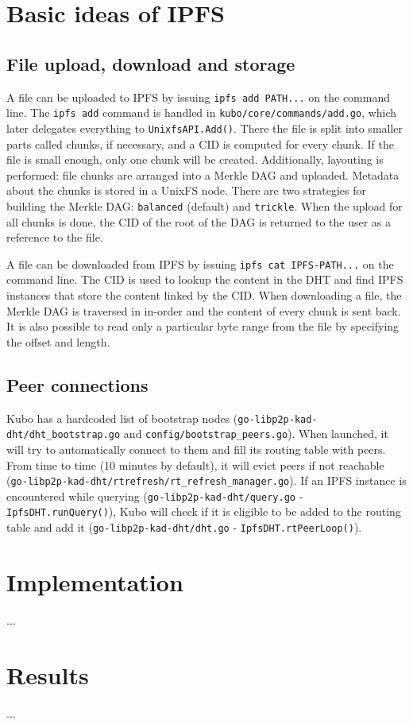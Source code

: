 




\section{Basic ideas of IPFS}

\subsection{File upload, download and storage}

A file can be uploaded to IPFS by issuing \verb|ipfs add PATH...| on the
command line. The \verb|ipfs add| command is handled in
\verb|kubo/core/commands/add.go|, which later delegates everything to
\verb|UnixfsAPI.Add()|. There the file is split into smaller parts called
chunks, if necessary, and a CID is computed for every chunk. If the file is
small enough, only one chunk will be created. Additionally, layouting is
performed: file chunks are arranged into a Merkle DAG and uploaded. Metadata
about the chunks is stored in a UnixFS node. There are two strategies for
building the Merkle DAG: \verb|balanced| (default) and \verb|trickle|. When the
upload for all chunks is done, the CID of the root of the DAG is returned to
the user as a reference to the file.

A file can be downloaded from IPFS by issuing \verb|ipfs cat IPFS-PATH...| on
the command line. The CID is used to lookup the content in the DHT and find
IPFS instances that store the content linked by the CID. When downloading a
file, the Merkle DAG is traversed in in-order and the content of every chunk is
sent back. It is also possible to read only a particular byte range from the
file by specifying the offset and length.


\subsection{Peer connections}

Kubo has a hardcoded list of bootstrap nodes
(\verb|go-libp2p-kad-dht/dht_bootstrap.go| and
\verb|config/bootstrap_peers.go|). When launched, it will try to automatically
connect to them and fill its routing table with peers. From time to time (10
minutes by default), it will evict peers if not reachable
(\verb|go-libp2p-kad-dht/rtrefresh/rt_refresh_manager.go|). If an IPFS instance
is encountered while querying (\verb|go-libp2p-kad-dht/query.go| -
\verb|IpfsDHT.runQuery()|), Kubo will check if it is eligible to be added to
the routing table and add it (\verb|go-libp2p-kad-dht/dht.go| -
\verb|IpfsDHT.rtPeerLoop()|).


\section{Implementation}

...


\section{Results}

...



